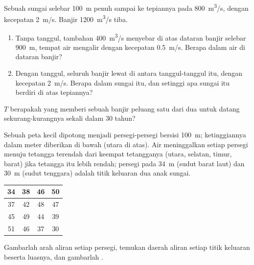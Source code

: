 \begin{exercise}[$\star\star\star$]\label{exo:g10:drainage-basins:13}
Sebuah sungai selebar \qty{100}{m} penuh sampai ke tepiannya pada
\qty{800}{m^3/s}, dengan kecepatan \qty{2}{m/s}. Banjir \qty{1200}{m^3/s} tiba.
\begin{enumerate}
  \item Tanpa tanggul, tambahan \qty{400}{m^3/s} menyebar di atas dataran
        banjir selebar \qty{900}{m}, tempat air mengalir dengan kecepatan
        \qty{0.5}{m/s}. Berapa dalam air di dataran banjir?
  \item Dengan tanggul, seluruh banjir lewat di antara tanggul-tanggul itu,
        dengan kecepatan \qty{2}{m/s}. Berapa dalam sungai itu, dan setinggi
        apa sungai itu berdiri di atas tepiannya?
\end{enumerate}
\end{exercise}

\begin{exercise}[$\star\star\star$]\label{exo:g10:drainage-basins:14}
 $T$ berapakah yang memberi sebuah banjir peluang satu dari dua
untuk datang sekurang-kurangnya sekali dalam \num{30} tahun?
\end{exercise}

\begin{exercise}[$\star\star\star$]\label{exo:g10:drainage-basins:15}
Sebuah peta kecil dipotong menjadi persegi-persegi bersisi \qty{100}{m};
ketinggiannya dalam meter diberikan di bawah (utara di atas). Air
meninggalkan setiap persegi menuju tetangga terendah dari keempat tetangganya
(utara, selatan, timur, barat) jika tetangga itu lebih rendah; persegi pada
\qty{34}{m} (sudut barat laut) dan \qty{30}{m} (sudut tenggara) adalah titik
keluaran dua anak sungai.
\begin{center}
\begin{tabular}{|c|c|c|c|}
\hline
34 & 38 & 46 & 50 \\ \hline
37 & 42 & 48 & 47 \\ \hline
45 & 49 & 44 & 39 \\ \hline
51 & 46 & 37 & 30 \\ \hline
\end{tabular}
\end{center}
Gambarlah arah aliran setiap persegi, temukan daerah aliran setiap titik
keluaran beserta luasnya, dan gambarlah .
\end{exercise}

